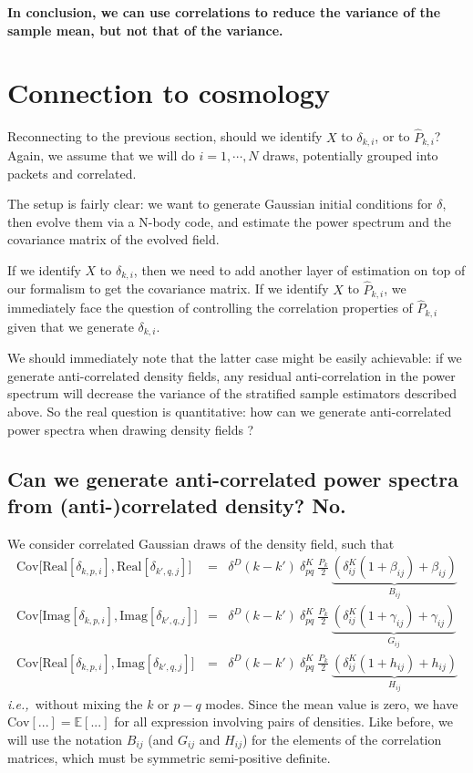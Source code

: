 \documentclass{aastex6}
\newcommand{\ie}{{\textit{i.e.,}~}}
\newcommand{\eqn}[1]{\begin{eqnarray}#1\end{eqnarray}}
\begin{document}
\textbf{In conclusion, we can use correlations to reduce the variance of the sample mean, but not that of the variance. }

\section{Connection to cosmology}

Reconnecting to the previous section, should we identify $X$ to $\delta_{k, i}$, or to $\hat{P}_{k,i}$? Again, we assume that we will do $i=1, \cdots, N$ draws, potentially grouped into packets and correlated.

The setup is fairly clear: we want to generate Gaussian initial conditions for $\delta$, then evolve them via a N-body code, and estimate the power spectrum and the covariance matrix of the evolved field. 

If we identify $X$ to $\delta_{k, i}$, then we need to add another layer of estimation on top of our formalism to get the covariance matrix. 
If we identify $X$ to $\hat{P}_{k,i}$, we immediately face the question of controlling the correlation properties of $\hat{P}_{k,i}$ given that we generate $\delta_{k, i}$.

We should immediately note that the latter case might be easily achievable: if we generate anti-correlated density fields, any residual anti-correlation in the power spectrum will decrease the variance of the stratified sample estimators described above. So the real question is quantitative: how can we generate anti-correlated power spectra when drawing density fields ?


\subsection{Can we generate anti-correlated power spectra from (anti-)correlated density? No.}

We consider correlated Gaussian draws of the density field, such that
\eqn{
	\mathrm{Cov}\bigl[\mathrm{Real}[\delta_{k, p, i}], \mathrm{Real}[\delta_{k', q, j}]\bigr] &=& \delta^D(k-k') \ \delta^K_{pq}\  \frac{P_k}{2}\ \underbrace{( \delta^K_{ij}(1+\beta_{ij}) + \beta_{ij})}_{B_{ij}}	\\
	\mathrm{Cov}\bigl[\mathrm{Imag}[\delta_{k, p, i}], \mathrm{Imag}[\delta_{k', q, j}] \bigr] &=& \delta^D(k-k') \ \delta^K_{pq}\  \frac{P_k}{2}\ \underbrace{( \delta^K_{ij}(1+\gamma_{ij}) + \gamma_{ij})}_{G_{ij}}\\
	\mathrm{Cov}\bigl[\mathrm{Real}[\delta_{k, p, i}], \mathrm{Imag}[\delta_{k', q, j}] \bigr] &=& \delta^D(k-k') \ \delta^K_{pq}\  \frac{P_k}{2}\ \underbrace{( \delta^K_{ij}(1+h_{ij}) + h_{ij})}_{H_{ij}}
}
\ie without mixing the $k$ or $p-q$ modes.
Since the mean value is zero, we have $\mathrm{Cov}[...] = \mathbb{E}[...]$ for all expression involving pairs of densities.
Like before, we will use the notation $B_{ij}$ (and $G_{ij}$ and $H_{ij}$) for the elements of the correlation matrices, which must be symmetric semi-positive definite.
\end{document}
